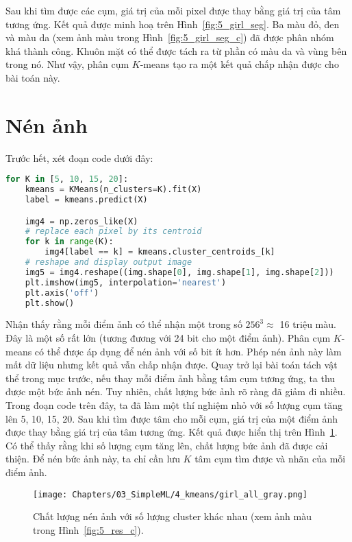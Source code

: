 Sau khi tìm được các cụm, giá trị của mỗi pixel được thay bằng giá trị của
tâm tương ứng. Kết quả được minh hoạ trên Hình~\ref{fig:5_girl_seg}. Ba màu
đỏ, đen và màu da (xem ảnh màu trong Hình~\ref{fig:5_girl_seg_c}) đã được phân
nhóm khá thành công. Khuôn mặt có thể được tách ra từ phần có màu da và vùng
bên trong nó. Như vậy, phân cụm $K$-means tạo ra một kết quả chấp nhận được
cho bài toán này.


\section{Nén ảnh}

Trước hết, xét đoạn code dưới đây:

\begin{lstlisting}[language=Python]
for K in [5, 10, 15, 20]:
    kmeans = KMeans(n_clusters=K).fit(X)
    label = kmeans.predict(X)

    img4 = np.zeros_like(X)
    # replace each pixel by its centroid
    for k in range(K):
        img4[label == k] = kmeans.cluster_centroids_[k]
    # reshape and display output image
    img5 = img4.reshape((img.shape[0], img.shape[1], img.shape[2]))
    plt.imshow(img5, interpolation='nearest')
    plt.axis('off')
    plt.show()
\end{lstlisting}

Nhận thấy rằng mỗi điểm ảnh có thể nhận một trong số $256^3 \approx $ 16 triệu
màu. Đây là một số rất lớn (tương đương với 24 bit cho một điểm ảnh). Phân cụm
$K$-means có thể được áp dụng để nén ảnh với số bit ít hơn. Phép nén ảnh này làm
mất dữ liệu nhưng kết quả vẫn chấp nhận được. Quay trở lại bài toán tách vật thể
trong mục trước, nếu thay mỗi điểm ảnh bằng tâm cụm tương ứng, ta thu được một
bức ảnh nén. Tuy nhiên, chất lượng bức ảnh rõ ràng đã giảm đi nhiều. Trong đoạn
code trên đây, ta đã làm một thí nghiệm nhỏ với số lượng cụm tăng lên 5, 10, 15,
20. Sau khi tìm được tâm cho mỗi cụm, giá trị của một điểm ảnh được thay bằng
giá trị của tâm tương ứng. Kết quả được hiển thị trên Hình~\ref{fig:5_res}. Có
thể thấy rằng khi số lượng cụm tăng lên, chất lượng bức ảnh đã được cải thiện.
Để nén bức ảnh này, ta chỉ cần lưu $K$ tâm cụm tìm được và nhãn của mỗi điểm
ảnh.



\begin{figure}[t]
\centering
    \texttt{[image: Chapters/03\_SimpleML/4\_kmeans/girl\_all\_gray.png]}
    \caption[]{Chất lượng nén ảnh với số lượng cluster khác nhau (xem ảnh màu trong Hình~\ref{fig:5_res_c}).}
    \label{fig:5_res}
\end{figure}


